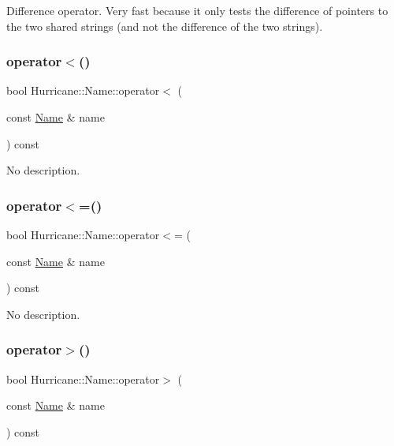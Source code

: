 Difference operator. Very fast because it only tests the difference of pointers to the two shared strings (and not the difference of the two strings). \mbox{\label{classHurricane_1_1Name_a9ce91a54cd340fb1e14baf56797f1577}} 
\subsubsection{\texorpdfstring{operator$<$()}{operator<()}}
{\footnotesize\ttfamily bool Hurricane\+::\+Name\+::operator$<$ (\begin{DoxyParamCaption}\item[{const \mbox{\hyperlink{classHurricane_1_1Name}{Name}} \&}]{name }\end{DoxyParamCaption}) const}

No description. \mbox{\label{classHurricane_1_1Name_a9704f9fe4c605a86de13b6a8d90feab2}} 
\subsubsection{\texorpdfstring{operator$<$=()}{operator<=()}}
{\footnotesize\ttfamily bool Hurricane\+::\+Name\+::operator$<$= (\begin{DoxyParamCaption}\item[{const \mbox{\hyperlink{classHurricane_1_1Name}{Name}} \&}]{name }\end{DoxyParamCaption}) const}

No description. \mbox{\label{classHurricane_1_1Name_a33bd981f4f6923a50c603cd06283032d}} 
\subsubsection{\texorpdfstring{operator$>$()}{operator>()}}
{\footnotesize\ttfamily bool Hurricane\+::\+Name\+::operator$>$ (\begin{DoxyParamCaption}\item[{const \mbox{\hyperlink{classHurricane_1_1Name}{Name}} \&}]{name }\end{DoxyParamCaption}) const}

